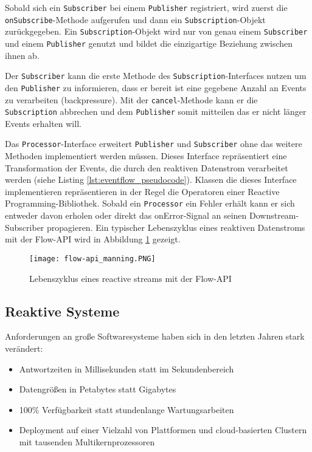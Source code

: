 Sobald sich ein \verb|Subscriber| bei einem \verb|Publisher| registriert, wird zuerst die \verb|onSubscribe|-Methode aufgerufen und dann ein
\verb|Subscription|-Objekt zurückgegeben. Ein \verb|Subscription|-Objekt wird nur von genau einem \verb|Subscriber| und einem \verb|Publisher| genutzt
und bildet die einzigartige Beziehung zwischen ihnen ab.

Der \verb|Subscriber| kann die erste Methode des \verb|Subscription|-Interfaces nutzen um den \verb|Publisher| zu informieren, dass er bereit
ist eine gegebene Anzahl an Events zu verarbeiten (backpressure). Mit der \verb|cancel|-Methode kann er die \verb|Subscription| abbrechen und dem \verb|Publisher|
somit mitteilen das er nicht länger Events erhalten will.
\parencite{JavaSEFlow}

Das \verb|Processor|-Interface erweitert \verb|Publisher| und \verb|Subscriber| ohne das weitere Methoden implementiert werden müssen.
Dieses Interface repräsentiert eine Transformation der Events, die durch den
reaktiven Datenstrom verarbeitet werden (siehe Listing \ref{lst:eventflow_pseudocode}).
Klassen die dieses Interface implementieren repräsentieren in der Regel die Operatoren einer Reactive Programming-Bibliothek.
Sobald ein \verb|Processor| ein Fehler erhält kann er sich entweder davon erholen oder direkt das onError-Signal an seinen
Downstream-Subscriber propagieren. Ein typischer Lebenszyklus eines reaktiven Datenstroms mit der Flow-API wird in
Abbildung \ref{fig:flow-api} gezeigt.
\begin{figure}[ht!]
	\centering
	\texttt{[image: flow-api\_manning.PNG]}
	\caption{Lebenszyklus eines reactive streams mit der Flow-API \parencite[Kapitel 17,  Figure 17.3]{JavaInAction}}
	\label{fig:flow-api}
\end{figure}
\newpage

\subsection{Reaktive Systeme}
\label{subsection:reaktive_systeme}
Anforderungen an große Softwaresysteme haben sich in den letzten Jahren stark verändert:
\begin{itemize}
	\item Antwortzeiten in Millisekunden statt im Sekundenbereich
	\item Datengrößen in Petabytes statt Gigabytes
	\item 100\% Verfügbarkeit statt stundenlange Wartungsarbeiten
	\item Deployment auf einer Vielzahl von Plattformen und cloud-basierten Clustern mit tausenden Multikernprozessoren
\end{itemize}

